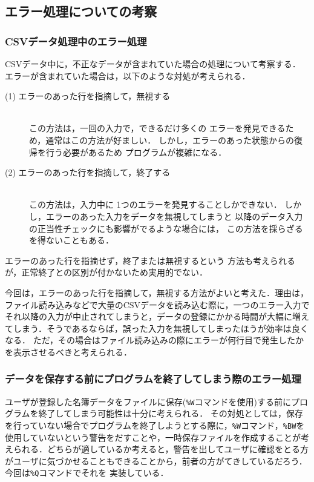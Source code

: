 \documentclass[a4paper,11pt]{jarticle}
\begin{document}
\subsection{エラー処理についての考察}

\subsubsection{CSVデータ処理中のエラー処理}

CSVデータ中に，不正なデータが含まれていた場合の処理について考察する．
エラーが含まれていた場合は，以下のような対処が考えられる．

\begin{description} %
  \item[(1) エラーのあった行を指摘して，無視する]~\\
    この方法は，一回の入力で，できるだけ多くの
    エラーを発見できるため，通常はこの方法が好ましい．
    しかし，エラーのあった状態からの復帰を行う必要があるため
    プログラムが複雑になる．
  \item[(2) エラーのあった行を指摘して，終了する]~\\
    この方法は，入力中に 1つのエラーを発見することしかできない．
    しかし，エラーのあった入力をデータを無視してしまうと
    以降のデータ入力の正当性チェックにも影響がでるような場合には，
    この方法を採らざるを得ないこともある．
\end{description}

エラーのあった行を指摘せず，終了または無視するという
方法も考えられるが，正常終了との区別が付かないため実用的でない．

今回は，エラーのあった行を指摘して，無視する方法がよいと考えた．理由は，ファイル読み込みなどで大量のCSVデータを読み込む際に，一つのエラー入力で
それ以降の入力が中止されてしまうと，データの登録にかかる時間が大幅に増えてしまう．そうであるならば，誤った入力を無視してしまったほうが効率は良くなる．
ただ，その場合はファイル読み込みの際にエラーが何行目で発生したかを表示させるべきと考えられる．

\subsubsection{データを保存する前にプログラムを終了してしまう際のエラー処理}
ユーザが登録した名簿データをファイルに保存(\verb|%W|コマンドを使用)する前にプログラムを終了してしまう可能性は十分に考えられる．
その対処としては，保存を行っていない場合でプログラムを終了しようとする際に，\verb|%W|コマンド，\verb|%BW|を使用していないという警告をだすことや，一時保存ファイルを作成することが考えられる．どちらが適しているか考えると，警告を出してユーザに確認をとる方がユーザに気づかせることもできることから，前者の方がてきしているだろう．今回は\verb|%Q|コマンドでそれを
実装している．
\end{document}
